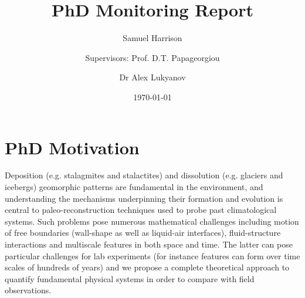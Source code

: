 \documentclass[12pt]{article}
\title{PhD Monitoring Report}
\author[1,2]{Samuel  Harrison}
\author[2]{\authorcr Supervisors: Prof. D.T. Papageorgiou}
\author[1]{\authorcr Dr Alex Lukyanov }
\affil[1]{ University of Reading}
\affil[2]{Imperial College London}
\date{\today}
\begin{document}
	\maketitle
	\section{PhD Motivation}
Deposition (e.g. stalagmites and stalactites) and dissolution (e.g. glaciers and icebergs) geomorphic patterns are fundamental in the environment,
and understanding the mechanisms underpinning their formation and evolution is central to paleo-reconstruction techniques used to
probe past climatological systems. Such problems pose numerous mathematical challenges including motion of free boundaries (wall-shape as well
as liquid-air interfaces), fluid-structure interactions and multiscale features in both space and time. The latter can pose particular challenges for
lab experiments (for instance features can form over time scales of hundreds of years) and we propose a complete theoretical approach
to quantify fundamental physical systems in order to compare with field observations.
\end{document}
